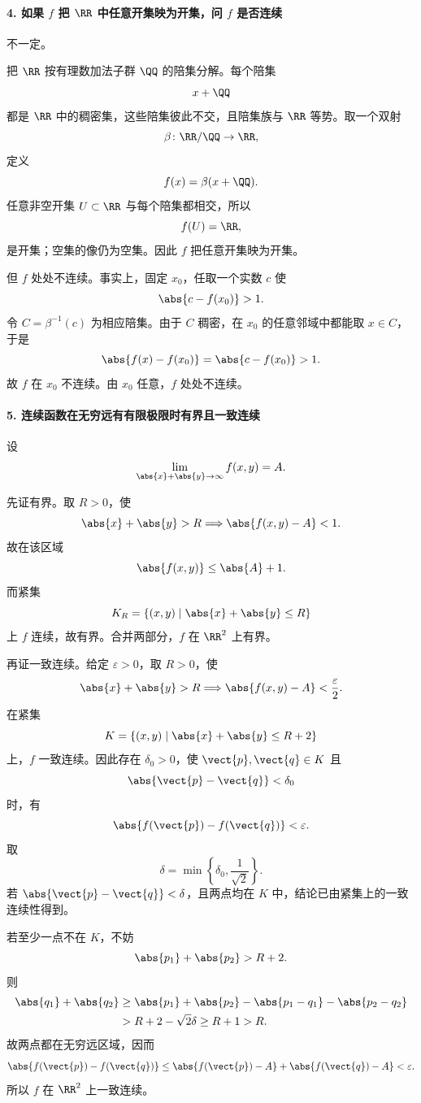 \paragraph{4. 如果 $f$ 把 $\RR$ 中任意开集映为开集，问 $f$ 是否连续}
\begin{xsolution}
不一定。

把 $\RR$ 按有理数加法子群 $\QQ$ 的陪集分解。每个陪集
\[
  x+\QQ
\]
都是 $\RR$ 中的稠密集，这些陪集彼此不交，且陪集族与 $\RR$ 等势。取一个双射
\[
  \beta\colon\RR/\QQ\to\RR,
\]
定义
\[
  f(x)=\beta(x+\QQ).
\]
任意非空开集 $U\subset\RR$ 与每个陪集都相交，所以
\[
  f(U)=\RR,
\]
是开集；空集的像仍为空集。因此 $f$ 把任意开集映为开集。

但 $f$ 处处不连续。事实上，固定 $x_0$，任取一个实数 $c$ 使
\[
  \abs{c-f(x_0)}>1.
\]
令 $C=\beta^{-1}(c)$ 为相应陪集。由于 $C$ 稠密，在 $x_0$ 的任意邻域中都能取 $x\in C$，于是
\[
  \abs{f(x)-f(x_0)}=\abs{c-f(x_0)}>1.
\]
故 $f$ 在 $x_0$ 不连续。由 $x_0$ 任意，$f$ 处处不连续。
\end{xsolution}

\paragraph{5. 连续函数在无穷远有有限极限时有界且一致连续}
\begin{xsolution}
设
\[
  \lim_{\abs{x}+\abs{y}\to\infty}f(x,y)=A.
\]

先证有界。取 $R>0$，使
\[
  \abs{x}+\abs{y}>R
  \Longrightarrow
  \abs{f(x,y)-A}<1.
\]
故在该区域
\[
  \abs{f(x,y)}\le\abs{A}+1.
\]
而紧集
\[
  K_R=\{(x,y)\mid\abs{x}+\abs{y}\le R\}
\]
上 $f$ 连续，故有界。合并两部分，$f$ 在 $\RR^2$ 上有界。

再证一致连续。给定 $\varepsilon>0$，取 $R>0$，使
\[
  \abs{x}+\abs{y}>R
  \Longrightarrow
  \abs{f(x,y)-A}<\frac\varepsilon2.
\]
在紧集
\[
  K=\{(x,y)\mid\abs{x}+\abs{y}\le R+2\}
\]
上，$f$ 一致连续。因此存在 $\delta_0>0$，使 $\vect{p},\vect{q}\in K$ 且
\[
  \abs{\vect{p}-\vect{q}}<\delta_0
\]
时，有
\[
  \abs{f(\vect{p})-f(\vect{q})}<\varepsilon.
\]
取
\[
  \delta=\min\left\{\delta_0,\frac1{\sqrt2}\right\}.
\]
若 $\abs{\vect{p}-\vect{q}}<\delta$，且两点均在 $K$ 中，结论已由紧集上的一致连续性得到。

若至少一点不在 $K$，不妨
\[
  \abs{p_1}+\abs{p_2}>R+2.
\]
则
\begin{align*}
  \abs{q_1}+\abs{q_2}
  &\ge
  \abs{p_1}+\abs{p_2}
  -\abs{p_1-q_1}-\abs{p_2-q_2}\\
  &>R+2-\sqrt2\delta
  \ge R+1>R.
\end{align*}
故两点都在无穷远区域，因而
\[
  \abs{f(\vect{p})-f(\vect{q})}
  \le\abs{f(\vect{p})-A}+\abs{f(\vect{q})-A}
  <\varepsilon.
\]
所以 $f$ 在 $\RR^2$ 上一致连续。
\end{xsolution}

